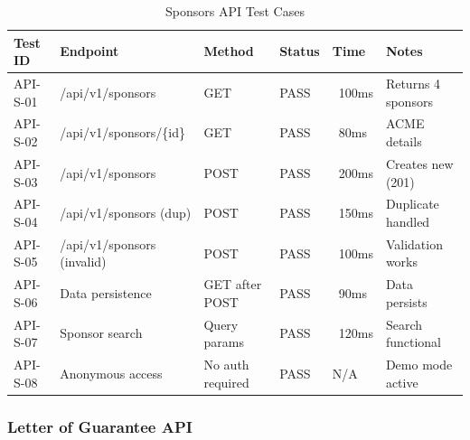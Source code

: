 \begin{table}[h!]
\centering
\caption{Sponsors API Test Cases}
\label{tab:appendix_sponsors_api}
\renewcommand{\arraystretch}{1.15}
\setlength{\tabcolsep}{4pt}
\begin{tabularx}{\textwidth}{@{}
  >{\RaggedLeft\arraybackslash}p{1.5cm}
  >{\RaggedRight\arraybackslash}p{3.8cm}
  >{\RaggedLeft\arraybackslash}p{1.5cm}
  >{\RaggedLeft\arraybackslash}p{1.8cm}
  >{\RaggedLeft\arraybackslash}p{1.8cm}
  >{\RaggedRight\arraybackslash}X
@{}}
\toprule
\textbf{Test ID} & \textbf{Endpoint} & \textbf{Method} & \textbf{Status} & \textbf{Time} & \textbf{Notes} \\
\midrule
API-S-01 & /api/v1/sponsors & GET & PASS & ~100ms & Returns 4 sponsors \\
API-S-02 & /api/v1/sponsors/\{id\} & GET & PASS & ~80ms & ACME details \\
API-S-03 & /api/v1/sponsors & POST & PASS & ~200ms & Creates new (201) \\
API-S-04 & /api/v1/sponsors (dup) & POST & PASS & ~150ms & Duplicate handled \\
API-S-05 & /api/v1/sponsors (invalid) & POST & PASS & ~100ms & Validation works \\
API-S-06 & Data persistence & GET after POST & PASS & ~90ms & Data persists \\
API-S-07 & Sponsor search & Query params & PASS & ~120ms & Search functional \\
API-S-08 & Anonymous access & No auth required & PASS & N/A & Demo mode active \\
\bottomrule
\end{tabularx}
\end{table}

\subsubsection{Letter of Guarantee API}

